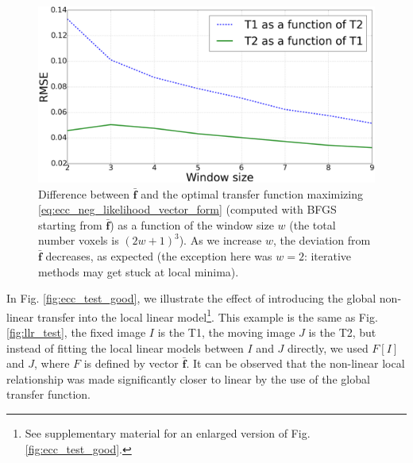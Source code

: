 \begin{figure}[t]
\centering
    \includegraphics[width=1.0\linewidth]{images/LLR_transfer_rmse.png}
    \caption{{\small Difference between $\mathbf{\bar{f}}$ and the optimal transfer function maximizing \eqref{eq:ecc_neg_likelihood_vector_form} (computed with BFGS starting from $\mathbf{\bar{f}}$) as a function of the window size $w$ (the total number voxels is $(2w+1)^{3}$). As we increase $w$, the deviation from $\mathbf{\bar{f}}$ decreases, as expected (the exception here was $w=2$: iterative methods may get stuck at local minima).}}
\label{fig:LLR_transfer_rmse}\figcloser
\end{figure}
In Fig. \ref{fig:ecc_test_good}, we illustrate the effect of introducing the global non-linear transfer into the local linear model\footnote{See supplementary material for an enlarged version of Fig. \ref{fig:ecc_test_good}.}. This example is the same as Fig. \ref{fig:llr_test}, the fixed image $I$ is the T1, the moving image $J$ is the T2, but instead of fitting the local linear models between $I$ and $J$ directly, we used $F[I]$ and $J$, where $F$ is defined by vector $\mathbf{\bar{f}}$. It can be observed that the non-linear local relationship was made significantly closer to linear by the use of the global transfer function.
